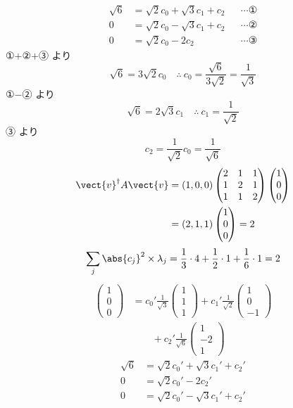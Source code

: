 \begin{align*}
\sqrt{6}&=\sqrt{2}c_{0}+\sqrt{3}c_{1}+c_{2}&&\cdots\text{①}\\
0&=\sqrt{2}c_{0}-\sqrt{3}c_{1}+c_{2}&&\cdots\text{②}\\
0&=\sqrt{2}c_{0}-2c_{2}&&\cdots\text{③}
\end{align*}
①$+$②$+$③ より
\[ \sqrt{6}=3\sqrt{2}c_{0}\quad\therefore\ c_{0}=\frac{\sqrt{6}}{3\sqrt{2}}=\frac{1}{\sqrt{3}} \]
①$-$② より
\[ \sqrt{6}=2\sqrt{3}c_{1}\quad\therefore\ c_{1}=\frac{1}{\sqrt{2}} \]
③ より
\[ c_{2}=\frac{1}{\sqrt{2}}c_{0}=\frac{1}{\sqrt{6}} \]
\begin{align*}
\vect{v}^{\dagger}A\vect{v}&=(1,0,0)\begin{pmatrix}2&1&1\\1&2&1\\1&1&2\end{pmatrix}\begin{pmatrix}1\\0\\0\end{pmatrix}\\
&=(2,1,1)\begin{pmatrix}1\\0\\0\end{pmatrix}=2
\end{align*}
\[ \sum_{j}\abs{c_{j}}^{2}\times\lambda_{j}=\frac{1}{3}\cdot4+\frac{1}{2}\cdot1+\frac{1}{6}\cdot1=2 \]
\begin{align*}
\begin{pmatrix}1\\0\\0\end{pmatrix}
&=c_{0}'\frac{1}{\sqrt{3}}\begin{pmatrix}1\\1\\1\end{pmatrix}+c_{1}'\frac{1}{\sqrt{2}}\begin{pmatrix}1\\0\\-1\end{pmatrix}\\
&\qquad+c_{2}'\frac{1}{\sqrt{6}}\begin{pmatrix}1\\-2\\1\end{pmatrix}
\end{align*}
\begin{align*}
\sqrt{6}&=\sqrt{2}c_{0}'+\sqrt{3}c_{1}'+c_{2}'\\
0&=\sqrt{2}c_{0}'-2c_{2}'\\
0&=\sqrt{2}c_{0}'-\sqrt{3}c_{1}'+c_{2}'
\end{align*}
